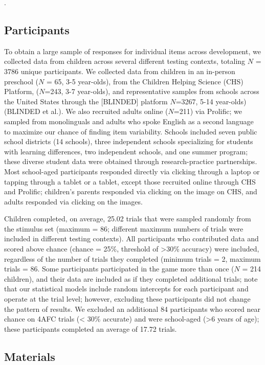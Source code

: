 \documentclass[
  man,mask]{apa6}
\begin{document}
.

\subsection{Participants}\label{participants}

To obtain a large sample of responses for individual items across development, we collected data from children across several different testing contexts, totaling \(N\) = 3786 unique participants. We collected data from children in an in-person preschool (\(N\) = 65, 3-5 year-olds), from the Children Helping Science (CHS) Platform, (\(N\)=243, 3-7 year-olds), and representative samples from schools across the United States through the {[}BLINDED{]} platform \(N\)=3267, 5-14 year-olds) (BLINDED et al.). We also recruited adults online (\(N\)=211) via Prolific; we sampled from monolinguals and adults who spoke English as a second language to maximize our chance of finding item variability. Schools included seven public school districts (14 schools), three independent schools specializing for students with learning differences, two independent schools, and one summer program; these diverse student data were obtained through research-practice partnerships. Most school-aged participants responded directly via clicking through a laptop or tapping through a tablet or a tablet, except those recruited online through CHS and Prolific; children's parents responded via clicking on the image on CHS, and adults responded via clicking on the images.

Children completed, on average, 25.02 trials that were sampled randomly from the stimulus set (maximum = 86; different maximum numbers of trials were included in different testing contexts).
All participants who contributed data and scored above chance (chance = 25\%, threshold of \textgreater30\% accuracy) were included, regardless of the number of trials they completed (minimum trials = 2, maximum trials = 86. Some participants participated in the game more than once (\(N\) = 214 children), and their data are included as if they completed additional trials; note that our statistical models include random intercepts for each participant and operate at the trial level; however, excluding these participants did not change the pattern of results.
We excluded an additional 84 participants who scored near chance on 4AFC trials (\textless{} 30\% accurate) and were school-aged (\textgreater6 years of age); these participants completed an average of 17.72 trials.

\subsection{Materials}\label{materials}
\end{document}
